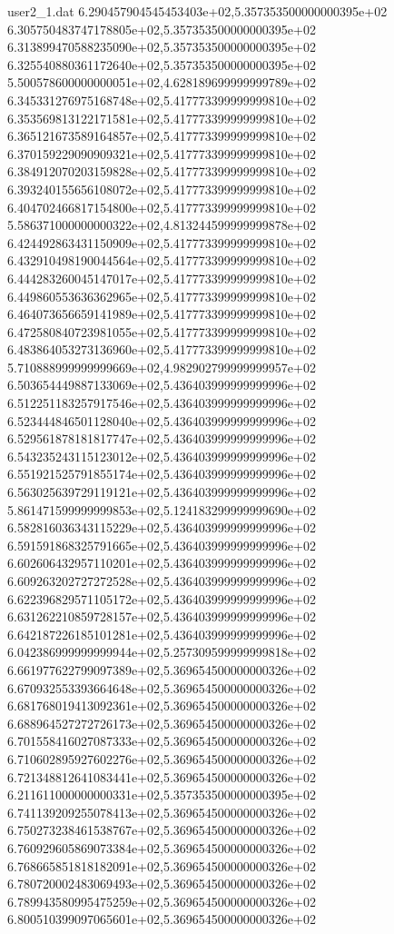 \begin{filecontents}{user2_1.dat}
6.290457904545453403e+02,5.357353500000000395e+02
6.305750483747178805e+02,5.357353500000000395e+02
6.313899470588235090e+02,5.357353500000000395e+02
6.325540880361172640e+02,5.357353500000000395e+02
5.500578600000000051e+02,4.628189699999999789e+02
6.345331276975168748e+02,5.417773399999999810e+02
6.353569813122171581e+02,5.417773399999999810e+02
6.365121673589164857e+02,5.417773399999999810e+02
6.370159229090909321e+02,5.417773399999999810e+02
6.384912070203159828e+02,5.417773399999999810e+02
6.393240155656108072e+02,5.417773399999999810e+02
6.404702466817154800e+02,5.417773399999999810e+02
5.586371000000000322e+02,4.813244599999999878e+02
6.424492863431150909e+02,5.417773399999999810e+02
6.432910498190044564e+02,5.417773399999999810e+02
6.444283260045147017e+02,5.417773399999999810e+02
6.449860553636362965e+02,5.417773399999999810e+02
6.464073656659141989e+02,5.417773399999999810e+02
6.472580840723981055e+02,5.417773399999999810e+02
6.483864053273136960e+02,5.417773399999999810e+02
5.710888999999999669e+02,4.982902799999999957e+02
6.503654449887133069e+02,5.436403999999999996e+02
6.512251183257917546e+02,5.436403999999999996e+02
6.523444846501128040e+02,5.436403999999999996e+02
6.529561878181817747e+02,5.436403999999999996e+02
6.543235243115123012e+02,5.436403999999999996e+02
6.551921525791855174e+02,5.436403999999999996e+02
6.563025639729119121e+02,5.436403999999999996e+02
5.861471599999999853e+02,5.124183299999999690e+02
6.582816036343115229e+02,5.436403999999999996e+02
6.591591868325791665e+02,5.436403999999999996e+02
6.602606432957110201e+02,5.436403999999999996e+02
6.609263202727272528e+02,5.436403999999999996e+02
6.622396829571105172e+02,5.436403999999999996e+02
6.631262210859728157e+02,5.436403999999999996e+02
6.642187226185101281e+02,5.436403999999999996e+02
6.042386999999999944e+02,5.257309599999999818e+02
6.661977622799097389e+02,5.369654500000000326e+02
6.670932553393664648e+02,5.369654500000000326e+02
6.681768019413092361e+02,5.369654500000000326e+02
6.688964527272726173e+02,5.369654500000000326e+02
6.701558416027087333e+02,5.369654500000000326e+02
6.710602895927602276e+02,5.369654500000000326e+02
6.721348812641083441e+02,5.369654500000000326e+02
6.211611000000000331e+02,5.357353500000000395e+02
6.741139209255078413e+02,5.369654500000000326e+02
6.750273238461538767e+02,5.369654500000000326e+02
6.760929605869073384e+02,5.369654500000000326e+02
6.768665851818182091e+02,5.369654500000000326e+02
6.780720002483069493e+02,5.369654500000000326e+02
6.789943580995475259e+02,5.369654500000000326e+02
6.800510399097065601e+02,5.369654500000000326e+02

\end{filecontents}
